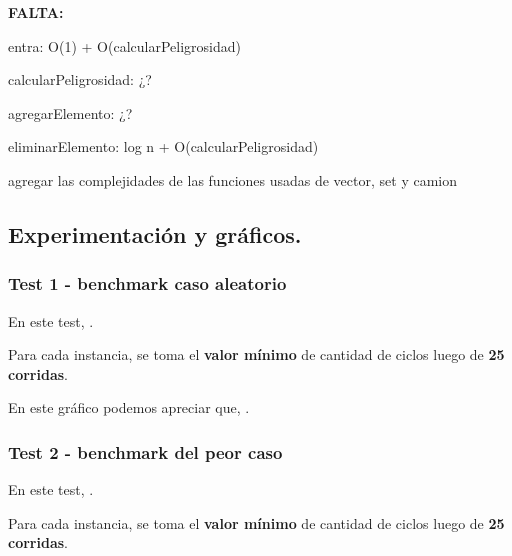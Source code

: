 \textbf{FALTA:}

entra: O(1) + O(calcularPeligrosidad)

calcularPeligrosidad: ¿?

agregarElemento: ¿?

eliminarElemento: log n + O(calcularPeligrosidad)

agregar las complejidades de las funciones usadas de vector, set y camion

\vspace*{0.75cm} \noindent



\subsection{Experimentación y gráficos.}

\vspace*{0.3cm}

\subsubsection{Test 1 - benchmark caso aleatorio}

En este test, .
 
Para cada instancia, se toma el \textbf{valor mínimo} de cantidad de ciclos luego de \textbf{25 corridas}. 

\vspace*{0.5cm}


\vspace*{0.5cm}

En este gráfico podemos apreciar que, .


\newpage


\subsubsection{Test 2 - benchmark del peor caso}

En este test, .

Para cada instancia, se toma el \textbf{valor mínimo} de cantidad de ciclos luego de \textbf{25 corridas}.

\vspace*{0.5cm}

